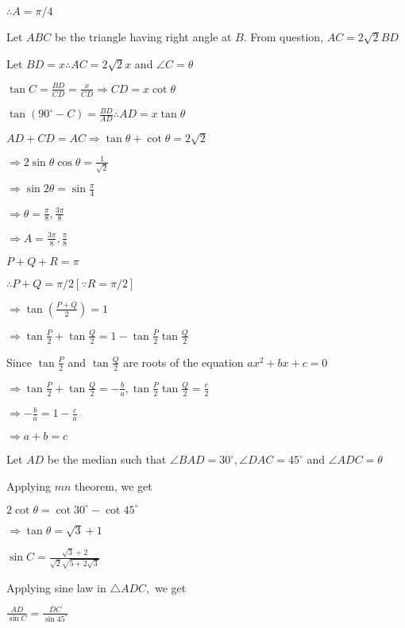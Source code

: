   $\therefore A = \pi/4$

\item Let $ABC$ be the triangle having right angle at $B$. From question, $AC = 2\sqrt{2}BD$

  Let $BD = x \therefore AC = 2\sqrt{2}x$ and $\angle C = \theta$

  $\tan C = \frac{BD}{CD} = \frac{x}{CD}\Rightarrow CD = x\cot\theta$

  $\tan(90^\circ - C) = \frac{BD}{AD} \therefore AD = x\tan\theta$

  $AD + CD = AC \Rightarrow \tan\theta + \cot\theta = 2\sqrt{2}$

  $\Rightarrow 2\sin\theta\cos\theta = \frac{1}{\sqrt{2}}$

  $\Rightarrow \sin2\theta = \sin\frac{\pi}{4}$

  $\Rightarrow \theta = \frac{\pi}{8}, \frac{3\pi}{8}$

  $\Rightarrow A = \frac{3\pi}{8}, \frac{\pi}{8}$

\item $P + Q + R = \pi$

  $\therefore P + Q = \pi/2 [\because R = \pi/2]$

  $\Rightarrow  \tan\left(\frac{P + Q}{2}\right) = 1$

  $\Rightarrow \tan\frac{P}{2} + \tan\frac{Q}{2} = 1 - \tan\frac{P}{2}\tan\frac{Q}{2}$

  Since $\tan\frac{P}{2}$ and $\tan\frac{Q}{2}$ are roots of the equation $ax^2 + bx + c = 0$

  $\Rightarrow \tan\frac{P}{2} + \tan\frac{Q}{2} = -\frac{b}{a}, \tan\frac{P}{2}\tan\frac{Q}{2} = \frac{c}{2}$

  $\Rightarrow -\frac{b}{a} = 1 - \frac{c}{a}$

  $\Rightarrow a + b = c$

\item Let $AD$ be the median such that $\angle BAD = 30^\circ, \angle DAC = 45^\circ$ and $\angle ADC = \theta$

  Applying $mn$ theorem, we get

  $2\cot\theta = \cot30^\circ - \cot45^\circ$

  $\Rightarrow \tan\theta = \sqrt{3} + 1$

  $\sin C = \frac{\sqrt{3} + 2}{\sqrt{2}\sqrt{5 + 2\sqrt{3}}}$

  Applying sine law in $\triangle ADC,$ we get

  $\frac{AD}{\sin C} = \frac{DC}{\sin45^\circ}$

